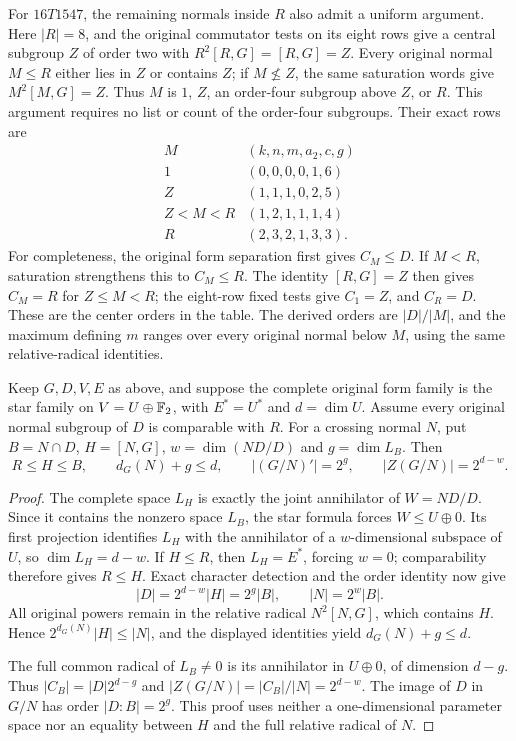 For $16T1547$, the remaining normals inside $R$ also admit a uniform
argument. Here $|R|=8$, and the original commutator tests on its eight
rows give a central subgroup $Z$ of order two with
$R^2[R,G]=[R,G]=Z$. Every original normal $M\leq R$ either lies in
$Z$ or contains $Z$; if $M\not\leq Z$, the same saturation words give
$M^2[M,G]=Z$. Thus $M$ is $1$, $Z$, an order-four subgroup above $Z$,
or $R$. This argument requires no list or count of the order-four
subgroups. Their exact rows are
\[
\begin{array}{c|c}
 M &(k,n,m,a_2,c,g)\\ \hline
 1 &(0,0,0,0,1,6)\\
 Z &(1,1,1,0,2,5)\\
 Z<M<R &(1,2,1,1,1,4)\\
 R &(2,3,2,1,3,3).
\end{array}
\]
For completeness, the original form separation first gives $C_M\leq D$.
If $M<R$, saturation strengthens this to $C_M\leq R$.
The identity $[R,G]=Z$ then gives $C_M=R$ for $Z\leq M<R$;
the eight-row fixed tests give $C_1=Z$, and $C_R=D$.
These are the center orders in the table. The derived orders are
$|D|/|M|$, and the maximum defining $m$ ranges over every original
normal below $M$, using the same relative-radical identities.

\begin{lemma}
\label{lem:carrier-star-crossing}
Keep $G,D,V,E$ as above, and suppose the complete original form family
is the star family on $V=U\oplus\mathbb F_2$, with $E^*=U^*$ and $d=\dim U$.
Assume every original normal subgroup of $D$ is comparable with $R$.
For a crossing normal $N$, put $B=N\cap D$, $H=[N,G]$,
$w=\dim(ND/D)$ and $g=\dim L_B$. Then
\[
 R\leq H\leq B,\qquad d_G(N)+g\leq d,\qquad
 |(G/N)'|=2^g,\qquad |Z(G/N)|=2^{d-w}.
\]
\end{lemma}
\begin{proof}
The complete space $L_H$ is exactly the joint annihilator of $W=ND/D$.
Since it contains the nonzero space $L_B$, the star formula forces
$W\leq U\oplus0$. Its first projection identifies $L_H$ with the
annihilator of a $w$-dimensional subspace of $U$, so
$\dim L_H=d-w$. If $H\leq R$, then $L_H=E^*$, forcing $w=0$;
comparability therefore gives $R\leq H$.
Exact character detection and the order identity now give
\[
 |D|=2^{d-w}|H|=2^g|B|,\qquad |N|=2^w|B|.
\]
All original powers remain in the relative radical $N^2[N,G]$,
which contains $H$. Hence
$2^{d_G(N)}|H|\leq|N|$, and the displayed identities yield
$d_G(N)+g\leq d$.

The full common radical of $L_B\ne0$ is its annihilator in
$U\oplus0$, of dimension $d-g$. Thus
$|C_B|=|D|2^{d-g}$ and $|Z(G/N)|=|C_B|/|N|=2^{d-w}$.
The image of $D$ in $G/N$ has order $|D:B|=2^g$.
This proof uses neither a one-dimensional parameter space nor an equality
between $H$ and the full relative radical of $N$.
\end{proof}

